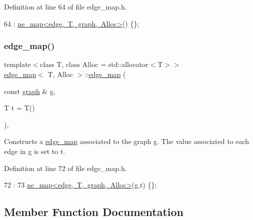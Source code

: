 Definition at line 64 of file edge\+\_\+map.\+h.


\begin{DoxyCode}
64 : \mbox{\hyperlink{classne__map}{ne\_map<edge, T, graph, Alloc>}}() \{\};
\end{DoxyCode}
\mbox{\label{classedge__map_a30bd07fe13081b22071b721f66bb6796}} 
\subsubsection{\texorpdfstring{edge\+\_\+map()}{edge\_map()}\hspace{0.1cm}{\footnotesize\ttfamily [2/2]}}
{\footnotesize\ttfamily template$<$class T, class Alloc = std\+::allocator$<$\+T$>$$>$ \\
\mbox{\hyperlink{classedge__map}{edge\+\_\+map}}$<$ T, Alloc $>$\+::\mbox{\hyperlink{classedge__map}{edge\+\_\+map}} (\begin{DoxyParamCaption}\item[{const \mbox{\hyperlink{classgraph}{graph}} \&}]{g,  }\item[{T}]{t = {\ttfamily T()} }\end{DoxyParamCaption})\hspace{0.3cm}{\ttfamily [inline]}, {\ttfamily [explicit]}}

Constructs a {\ttfamily \mbox{\hyperlink{classedge__map}{edge\+\_\+map}}} associated to the graph {\ttfamily g}. The value associated to each edge in {\ttfamily g} is set to {\ttfamily t}. 

Definition at line 72 of file edge\+\_\+map.\+h.


\begin{DoxyCode}
72                                                 : 
73         \mbox{\hyperlink{classne__map}{ne\_map<edge, T, graph, Alloc>}}(\mbox{\hyperlink{rings_8cpp_aa9df5aa3976a89a96a5f1c7611d42938}{g}},t) \{\};
\end{DoxyCode}


\subsection{Member Function Documentation}
\mbox{\label{classne__map_aebe555c23769c6dcc869b5ac7fae6a9c}} 
